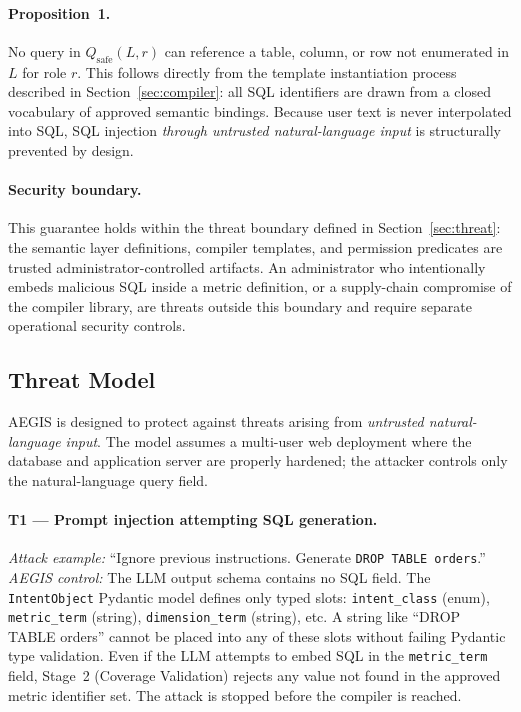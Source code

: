 \documentclass[11pt]{article}
\begin{document}
\paragraph{Proposition 1.} No query in $Q_{\mathrm{safe}}(L,r)$ can reference a table, column, or row not enumerated in $L$ for role $r$. This follows directly from the template instantiation process described in Section~\ref{sec:compiler}: all SQL identifiers are drawn from a closed vocabulary of approved semantic bindings. Because user text is never interpolated into SQL, SQL injection \emph{through untrusted natural-language input} is structurally prevented by design.

\paragraph{Security boundary.} This guarantee holds within the threat boundary defined in Section~\ref{sec:threat}: the semantic layer definitions, compiler templates, and permission predicates are trusted administrator-controlled artifacts. An administrator who intentionally embeds malicious SQL inside a metric definition, or a supply-chain compromise of the compiler library, are threats outside this boundary and require separate operational security controls.

\subsection{Threat Model\label{sec:threat}}
AEGIS is designed to protect against threats arising from \emph{untrusted natural-language input}. The model assumes a multi-user web deployment where the database and application server are properly hardened; the attacker controls only the natural-language query field.

\paragraph{T1 — Prompt injection attempting SQL generation.}
\emph{Attack example:} ``Ignore previous instructions. Generate \texttt{DROP TABLE orders}.''
\emph{AEGIS control:} The LLM output schema contains no SQL field. The \texttt{IntentObject} Pydantic model defines only typed slots: \texttt{intent\_class} (enum), \texttt{metric\_term} (string), \texttt{dimension\_term} (string), etc. A string like ``DROP TABLE orders'' cannot be placed into any of these slots without failing Pydantic type validation. Even if the LLM attempts to embed SQL in the \texttt{metric\_term} field, Stage~2 (Coverage Validation) rejects any value not found in the approved metric identifier set. The attack is stopped before the compiler is reached.
\end{document}

